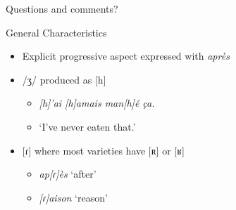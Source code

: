 \documentclass{beamer}\usepackage[]{graphicx}\usepackage[]{xcolor}
\newcommand{\lexi}[1]{\textit{#1}}
\newcommand{\gloss}[1]{`#1'}
\begin{document}
    \begin{frame}{}
      \begin{center}
        Questions and comments?
      \end{center}
    \end{frame}

    \begin{frame}{General Characteristics}
      \begin{itemize}
        \item Explicit progressive aspect expressed with \lexi{après} \parencite{papen_structural_1997}
        \item /ʒ/ produced as [h] \parencite{carmichael_language_2019}
        \begin{itemize}
          \item \lexi{[h]'ai [h]amais man[h]é ça.}
          \item \gloss{I've never eaten that.}
        \end{itemize}
        \item {}[ɾ] where most varieties have [ʀ] or [ʁ] \parencite{blainey_first_2013}
        \begin{itemize}
          \item \lexi{ap[ɾ]ès} \gloss{after}
          \item \lexi{[ɾ]aison} \gloss{reason}
        \end{itemize}
      \end{itemize}
    \end{frame}
\end{document}
